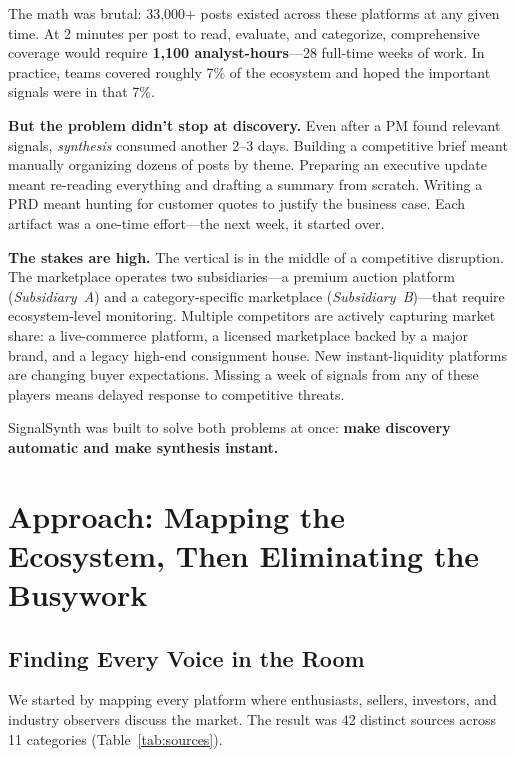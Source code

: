 \documentclass[11pt]{article}
\begin{document}
The math was brutal: 33,000+ posts existed across these platforms at any given time. At 2 minutes per post to read, evaluate, and categorize, comprehensive coverage would require \textbf{1,100 analyst-hours}---28 full-time weeks of work. In practice, teams covered roughly 7\% of the ecosystem and hoped the important signals were in that 7\%.

\textbf{But the problem didn't stop at discovery.} Even after a PM found relevant signals, \textit{synthesis} consumed another 2--3 days. Building a competitive brief meant manually organizing dozens of posts by theme. Preparing an executive update meant re-reading everything and drafting a summary from scratch. Writing a PRD meant hunting for customer quotes to justify the business case. Each artifact was a one-time effort---the next week, it started over.

\textbf{The stakes are high.} The vertical is in the middle of a competitive disruption. The marketplace operates two subsidiaries---a premium auction platform (\textit{Subsidiary~A}) and a category-specific marketplace (\textit{Subsidiary~B})---that require ecosystem-level monitoring. Multiple competitors are actively capturing market share: a live-commerce platform, a licensed marketplace backed by a major brand, and a legacy high-end consignment house. New instant-liquidity platforms are changing buyer expectations. Missing a week of signals from any of these players means delayed response to competitive threats.

SignalSynth was built to solve both problems at once: \textbf{make discovery automatic and make synthesis instant.}

\section{Approach: Mapping the Ecosystem, Then Eliminating the Busywork}

\subsection{Finding Every Voice in the Room}
We started by mapping every platform where enthusiasts, sellers, investors, and industry observers discuss the market. The result was 42 distinct sources across 11 categories (Table~\ref{tab:sources}).
\end{document}
